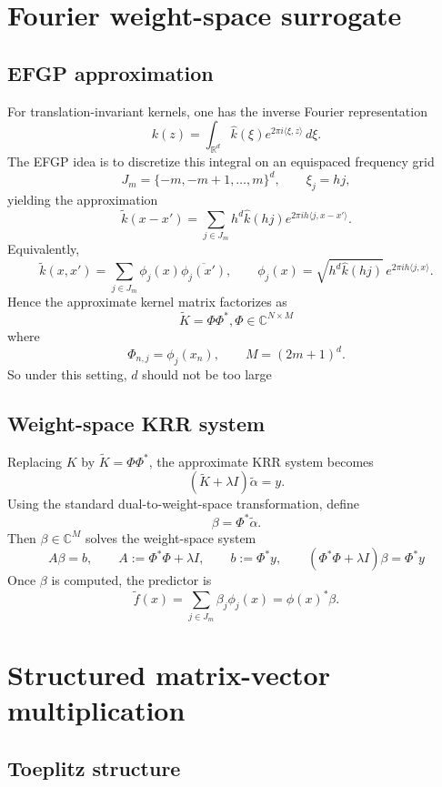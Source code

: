 \documentclass{article}
\begin{document}
\section{Fourier weight-space surrogate}

\subsection{EFGP approximation}

For translation-invariant kernels, one has the inverse Fourier representation
\[
k(z)=\int_{\mathbb{R}^d} \widehat{k}(\xi)e^{2\pi i \langle \xi,z\rangle}\,d\xi.
\]
The EFGP idea is to discretize this integral on an equispaced frequency grid
\[
J_m=\{-m,-m+1,\dots,m\}^d,
\qquad \xi_j = h j,
\]
yielding the approximation
\[
\widetilde{k}(x-x')
=
\sum_{j\in J_m} h^d \widehat{k}(hj)e^{2\pi i h \langle j,x-x'\rangle}.
\]
Equivalently,
\[
\widetilde{k}(x,x')
=
\sum_{j\in J_m} \phi_j(x)\overline{\phi_j(x')},
\qquad
\phi_j(x)=\sqrt{h^d \widehat{k}(hj)}\,e^{2\pi i h \langle j,x\rangle}.
\]
Hence the approximate kernel matrix factorizes as
\[
\widetilde{K}=\Phi\Phi^*, \Phi \in \mathbb{C}^{N\times M}
\]
where
\[
\Phi_{n,j}=\phi_j(x_n),
\qquad
M=(2m+1)^d.
\]
So under this setting, \(d\) should not be too large

\subsection{Weight-space KRR system}

Replacing \(K\) by \(\widetilde{K}=\Phi\Phi^*\), the approximate KRR system becomes
\[
(\widetilde{K}+\lambda I)\widetilde{\alpha}=y.
\]
Using the standard dual-to-weight-space transformation, define
\[
\beta=\Phi^* \widetilde{\alpha}.
\]
Then \(\beta\in\mathbb{C}^M\) solves the weight-space system
\[
A\beta=b, 
\qquad
A:=\Phi^*\Phi+\lambda I,
\qquad
b:=\Phi^*y,
\qquad (\Phi^*\Phi+\lambda I)\beta=\Phi^*y
\]
Once \(\beta\) is computed, the predictor is
\[
\widetilde{f}(x)=\sum_{j\in J_m} \beta_j \phi_j(x)=\phi(x)^*\beta.
\]


\section{Structured matrix-vector multiplication}

\subsection{Toeplitz structure}
\end{document}
